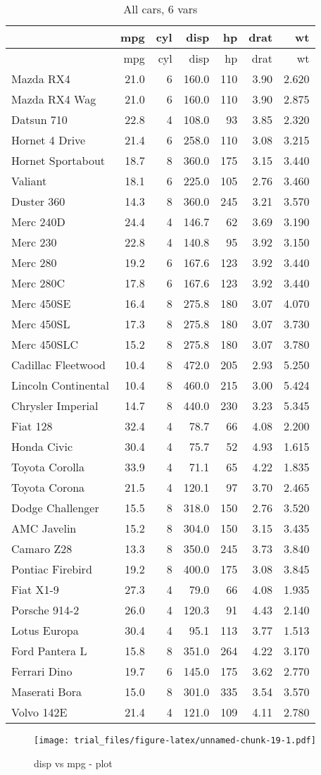 \documentclass[]{article}
\begin{document}
\begin{longtable}[]{@{}lrrrrrr@{}}
\caption{All cars, 6 vars}\tabularnewline
\toprule
& mpg & cyl & disp & hp & drat & wt\tabularnewline
\midrule
\endfirsthead
\toprule
& mpg & cyl & disp & hp & drat & wt\tabularnewline
\midrule
\endhead
Mazda RX4 & 21.0 & 6 & 160.0 & 110 & 3.90 & 2.620\tabularnewline
Mazda RX4 Wag & 21.0 & 6 & 160.0 & 110 & 3.90 & 2.875\tabularnewline
Datsun 710 & 22.8 & 4 & 108.0 & 93 & 3.85 & 2.320\tabularnewline
Hornet 4 Drive & 21.4 & 6 & 258.0 & 110 & 3.08 & 3.215\tabularnewline
Hornet Sportabout & 18.7 & 8 & 360.0 & 175 & 3.15 & 3.440\tabularnewline
Valiant & 18.1 & 6 & 225.0 & 105 & 2.76 & 3.460\tabularnewline
Duster 360 & 14.3 & 8 & 360.0 & 245 & 3.21 & 3.570\tabularnewline
Merc 240D & 24.4 & 4 & 146.7 & 62 & 3.69 & 3.190\tabularnewline
Merc 230 & 22.8 & 4 & 140.8 & 95 & 3.92 & 3.150\tabularnewline
Merc 280 & 19.2 & 6 & 167.6 & 123 & 3.92 & 3.440\tabularnewline
Merc 280C & 17.8 & 6 & 167.6 & 123 & 3.92 & 3.440\tabularnewline
Merc 450SE & 16.4 & 8 & 275.8 & 180 & 3.07 & 4.070\tabularnewline
Merc 450SL & 17.3 & 8 & 275.8 & 180 & 3.07 & 3.730\tabularnewline
Merc 450SLC & 15.2 & 8 & 275.8 & 180 & 3.07 & 3.780\tabularnewline
Cadillac Fleetwood & 10.4 & 8 & 472.0 & 205 & 2.93 &
5.250\tabularnewline
Lincoln Continental & 10.4 & 8 & 460.0 & 215 & 3.00 &
5.424\tabularnewline
Chrysler Imperial & 14.7 & 8 & 440.0 & 230 & 3.23 & 5.345\tabularnewline
Fiat 128 & 32.4 & 4 & 78.7 & 66 & 4.08 & 2.200\tabularnewline
Honda Civic & 30.4 & 4 & 75.7 & 52 & 4.93 & 1.615\tabularnewline
Toyota Corolla & 33.9 & 4 & 71.1 & 65 & 4.22 & 1.835\tabularnewline
Toyota Corona & 21.5 & 4 & 120.1 & 97 & 3.70 & 2.465\tabularnewline
Dodge Challenger & 15.5 & 8 & 318.0 & 150 & 2.76 & 3.520\tabularnewline
AMC Javelin & 15.2 & 8 & 304.0 & 150 & 3.15 & 3.435\tabularnewline
Camaro Z28 & 13.3 & 8 & 350.0 & 245 & 3.73 & 3.840\tabularnewline
Pontiac Firebird & 19.2 & 8 & 400.0 & 175 & 3.08 & 3.845\tabularnewline
Fiat X1-9 & 27.3 & 4 & 79.0 & 66 & 4.08 & 1.935\tabularnewline
Porsche 914-2 & 26.0 & 4 & 120.3 & 91 & 4.43 & 2.140\tabularnewline
Lotus Europa & 30.4 & 4 & 95.1 & 113 & 3.77 & 1.513\tabularnewline
Ford Pantera L & 15.8 & 8 & 351.0 & 264 & 4.22 & 3.170\tabularnewline
Ferrari Dino & 19.7 & 6 & 145.0 & 175 & 3.62 & 2.770\tabularnewline
Maserati Bora & 15.0 & 8 & 301.0 & 335 & 3.54 & 3.570\tabularnewline
Volvo 142E & 21.4 & 4 & 121.0 & 109 & 4.11 & 2.780\tabularnewline
\bottomrule
\end{longtable}

\begin{figure}[htbp]
\centering
\texttt{[image: trial\_files/figure-latex/unnamed-chunk-19-1.pdf]}
\caption{disp vs mpg - plot}
\end{figure}
\end{document}
